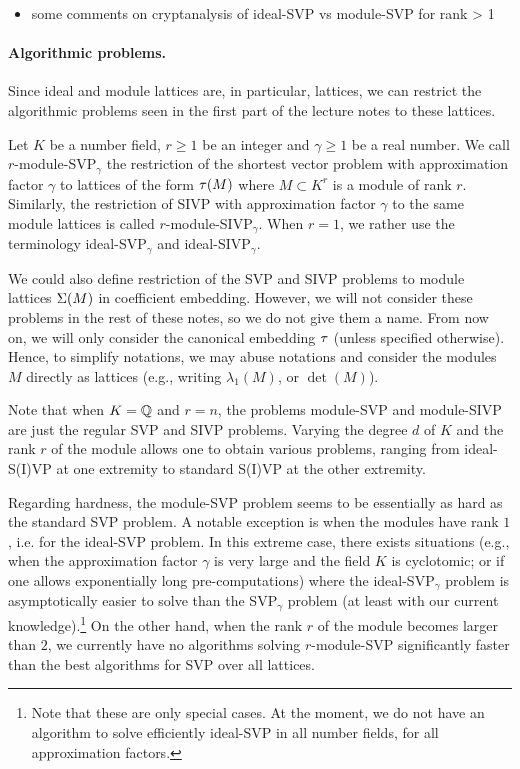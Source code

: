 \begin{itemize}
\item some comments on cryptanalysis of ideal-SVP vs module-SVP for rank > 1
\end{itemize}

\paragraph{Algorithmic problems.} Since ideal and module lattices are, in particular, lattices, we can restrict the algorithmic problems seen in the first part of the lecture notes to these lattices.

\begin{definition}
Let $K$ be a number field, $r \geq 1$ be an integer and $\gamma \geq 1$ be a real number. We call $r$-module-SVP$_\gamma$ the restriction of the shortest vector problem with approximation factor $\gamma$ to lattices of the form $\tau(M)$ where $M \subset K^r$ is a module of rank $r$.
Similarly, the restriction of SIVP with approximation factor $\gamma$ to the same module lattices is called $r$-module-SIVP$_\gamma$.
When $r = 1$, we rather use the terminology ideal-SVP$_\gamma$ and ideal-SIVP$_\gamma$.
\end{definition}

We could also define restriction of the SVP and SIVP problems to module lattices $\Sigma(M)$ in coefficient embedding. However, we will not consider these problems in the rest of these notes, so we do not give them a name. From now on, we will only consider the canonical embedding $\tau$ (unless specified otherwise). Hence, to simplify notations, we may abuse notations and consider the modules $M$ directly as lattices (e.g., writing $\lambda_1(M)$, or $\det(M)$).

Note that when $K = \mathbb{Q}$ and $r = n$, the problems module-SVP and module-SIVP are just the regular SVP and SIVP problems. Varying the degree $d$ of $K$ and the rank $r$ of the module allows one to obtain various problems, ranging from ideal-S(I)VP at one extremity to standard S(I)VP at the other extremity.

Regarding hardness, the module-SVP problem seems to be essentially as hard as the standard SVP problem. A notable exception is when the modules have rank $1$, i.e. for the ideal-SVP problem. In this extreme case, there exists situations (e.g., when the approximation factor $\gamma$ is very large and the field $K$ is cyclotomic; or if one allows exponentially long pre-computations) where the ideal-SVP$_\gamma$ problem is asymptotically easier to solve than the SVP$_\gamma$ problem (at least with our current knowledge).\footnote{Note that these are only special cases. At the moment, we do not have an algorithm to solve efficiently ideal-SVP in all number fields, for all approximation factors.}
On the other hand, when the rank $r$ of the module becomes larger than $2$, we currently have no algorithms solving $r$-module-SVP significantly faster than the best algorithms for SVP over all lattices.

